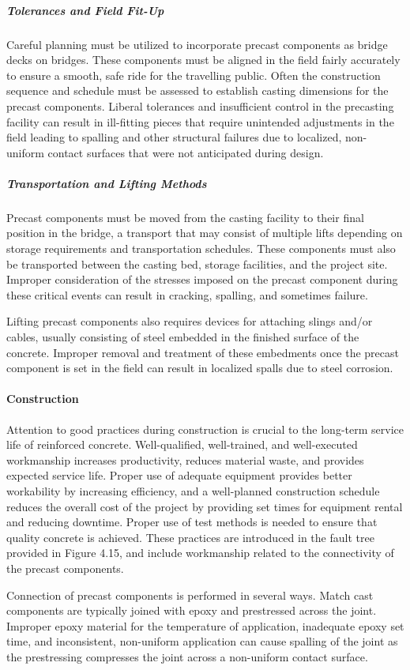 \subparagraph{Tolerances and Field Fit-Up}
Careful planning must be utilized to incorporate precast components as bridge decks on bridges. These
components must be aligned in the field fairly accurately to ensure a smooth, safe ride for the travelling public. Often
the construction sequence and schedule must be assessed to establish casting dimensions for the precast components.
Liberal tolerances and insufficient control in the precasting facility can result in ill-fitting pieces that require
unintended adjustments in the field leading to spalling and other structural failures due to localized, non-uniform
contact surfaces that were not anticipated during design.

\subparagraph{Transportation and Lifting Methods}
Precast components must be moved from the casting facility to their final position in the bridge, a transport that
may consist of multiple lifts depending on storage requirements and transportation schedules. These components
must also be transported between the casting bed, storage facilities, and the project site. Improper consideration of the stresses imposed on the precast component during these critical events can result in cracking, spalling, and
sometimes failure.

Lifting precast components also requires devices for attaching slings and/or cables, usually consisting of steel
embedded in the finished surface of the concrete. Improper removal and treatment of these embedments once the
precast component is set in the field can result in localized spalls due to steel corrosion.

\paragraph{Construction}
Attention to good practices during construction is crucial to the long-term service life of reinforced concrete.
Well-qualified, well-trained, and well-executed workmanship increases productivity, reduces material waste, and
provides expected service life. Proper use of adequate equipment provides better workability by increasing
efficiency, and a well-planned construction schedule reduces the overall cost of the project by providing set times for
equipment rental and reducing downtime. Proper use of test methods is needed to ensure that quality concrete is
achieved. These practices are introduced in the fault tree provided in Figure 4.15, and include workmanship related to
the connectivity of the precast components.

Connection of precast components is performed in several ways. Match cast components are typically joined
with epoxy and prestressed across the joint. Improper epoxy material for the temperature of application, inadequate
epoxy set time, and inconsistent, non-uniform application can cause spalling of the joint as the prestressing
compresses the joint across a non-uniform contact surface.

